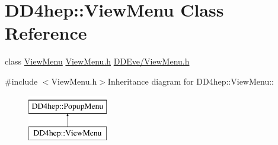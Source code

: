 \hypertarget{class_d_d4hep_1_1_view_menu}{
\section{DD4hep::ViewMenu Class Reference}
\label{class_d_d4hep_1_1_view_menu}
}


class \hyperlink{class_d_d4hep_1_1_view_menu}{ViewMenu} \hyperlink{_view_menu_8h}{ViewMenu.h} \hyperlink{_view_menu_8h}{DDEve/ViewMenu.h}  


{\ttfamily \#include $<$ViewMenu.h$>$}Inheritance diagram for DD4hep::ViewMenu::\begin{figure}[H]
\begin{center}
\leavevmode
\includegraphics[height=2cm]{class_d_d4hep_1_1_view_menu}
\end{center}
\end{figure}
